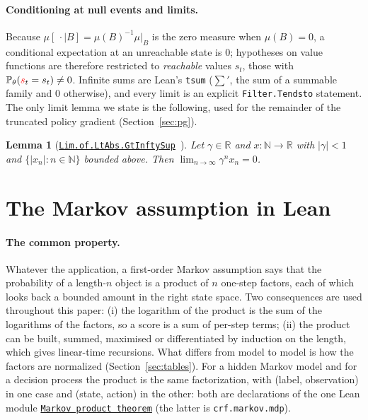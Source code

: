 \documentclass[11pt,a4paper]{article}
\newcommand{\lmod}[2]{\href{http://www.lemma.cn/lean/?module=#2}{\nolinkurl{#1}}}
\newtheorem{lemma}[theorem]{Lemma}
\newcommand{\R}{\mathbb{R}}
\newcommand{\N}{\mathbb{N}}
\newcommand{\Prb}{\mathbb{P}}
\newcommand{\rv}[1]{{\color{red}#1}}       %
\newcommand{\sv}{\rv{s}}
\newcommand{\tsum}{\textstyle\sum'}
\begin{document}
\paragraph{Conditioning at null events and limits.}
Because $\mu[\,\cdot\mid B]=\mu(B)^{-1}\mu|_B$ is the zero measure when $\mu(B)=0$, a conditional expectation at an unreachable state is $0$; hypotheses on value functions are therefore restricted to \emph{reachable} values $s_t$, those with $\Prb_\theta(\sv_t=s_t)\ne0$.
Infinite sums are Lean's \texttt{tsum} ($\tsum$, the sum of a summable family and $0$ otherwise), and every limit is an explicit \texttt{Filter.Tendsto} statement.
The only limit lemma we state is the following, used for the remainder of the truncated policy gradient (Section~\ref{sec:pg}).

\begin{lemma}[\lmod{Lim.of.LtAbs.GtInftySup}{Real.Eq_0.Lim.of.LtAbs.GtInftySup}~\cite{lemma_lim}]
\label{lem:lim}
Let $\gamma\in\R$ and $x:\N\to\R$ with $|\gamma|<1$ and $\{|x_n|:n\in\N\}$ bounded above.
Then $\displaystyle\lim_{n\to\infty}\gamma^n x_n=0$.
\end{lemma}

\section{The Markov assumption in Lean}
\label{sec:markov}

\paragraph{The common property.}
Whatever the application, a first-order Markov assumption says that the probability of a length-$n$ object is a product of $n$ one-step factors, each of which looks back a bounded amount in the right state space.
Two consequences are used throughout this paper: (i) the logarithm of the product is the sum of the logarithms of the factors, so a score is a sum of per-step terms; (ii) the product can be built, summed, maximised or differentiated by induction on the length, which gives linear-time recursions.
What differs from model to model is how the factors are normalized (Section~\ref{sec:tables}).
For a hidden Markov model and for a decision process the product is the same factorization, with (label, observation) in one case and (state, action) in the other: both are declarations of the one Lean module \lmod{Markov product theorem}{Random.ProbJoint.eq.Mul_Prod_MulProbSCond.of.IsDiscreteHMM} (the latter is \texttt{crf.markov.mdp}).
\end{document}
